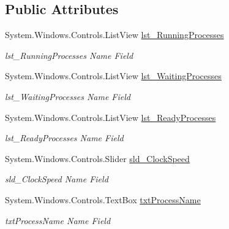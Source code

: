 \subsection*{Public Attributes}
\begin{DoxyCompactItemize}
\item 
System.\+Windows.\+Controls.\+List\+View \hyperlink{class_c_p_u___o_s___simulator_1_1_operating_system_main_window_a8710fe75e8464b39764d29184c2510fd}{lst\+\_\+\+Running\+Processes}
\begin{DoxyCompactList}\small\item\em lst\+\_\+\+Running\+Processes Name Field \end{DoxyCompactList}\item 
System.\+Windows.\+Controls.\+List\+View \hyperlink{class_c_p_u___o_s___simulator_1_1_operating_system_main_window_a70185c0d33e102e203d76b79ac5c77db}{lst\+\_\+\+Waiting\+Processes}
\begin{DoxyCompactList}\small\item\em lst\+\_\+\+Waiting\+Processes Name Field \end{DoxyCompactList}\item 
System.\+Windows.\+Controls.\+List\+View \hyperlink{class_c_p_u___o_s___simulator_1_1_operating_system_main_window_a00397da2e841d089d65441f5d4f19915}{lst\+\_\+\+Ready\+Processes}
\begin{DoxyCompactList}\small\item\em lst\+\_\+\+Ready\+Processes Name Field \end{DoxyCompactList}\item 
System.\+Windows.\+Controls.\+Slider \hyperlink{class_c_p_u___o_s___simulator_1_1_operating_system_main_window_a21bd388b7e1e821db2bfcee90530c3ae}{sld\+\_\+\+Clock\+Speed}
\begin{DoxyCompactList}\small\item\em sld\+\_\+\+Clock\+Speed Name Field \end{DoxyCompactList}\item 
System.\+Windows.\+Controls.\+Text\+Box \hyperlink{class_c_p_u___o_s___simulator_1_1_operating_system_main_window_a34784f7f4ffefd1dfa3e98c3bd03c260}{txt\+Process\+Name}
\begin{DoxyCompactList}\small\item\em txt\+Process\+Name Name Field \end{DoxyCompactList}\end{DoxyCompactItemize}
